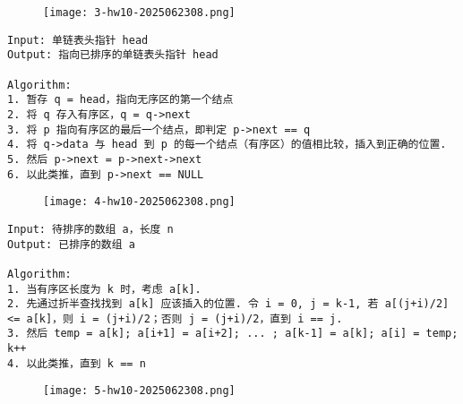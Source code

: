 \begin{exercise}
\begin{figure}[H]
\centering
\texttt{[image: 3-hw10-2025062308.png]}
\label{}
\end{figure}
\end{exercise}
\begin{lstlisting}
Input: 单链表头指针 head
Output: 指向已排序的单链表头指针 head

Algorithm:
1. 暂存 q = head，指向无序区的第一个结点
2. 将 q 存入有序区，q = q->next
3. 将 p 指向有序区的最后一个结点，即判定 p->next == q
4. 将 q->data 与 head 到 p 的每一个结点（有序区）的值相比较，插入到正确的位置.
5. 然后 p->next = p->next->next
6. 以此类推，直到 p->next == NULL
\end{lstlisting}
\begin{exercise}
\begin{figure}[H]
\centering
\texttt{[image: 4-hw10-2025062308.png]}
\label{}
\end{figure}
\end{exercise}
\begin{lstlisting}
Input: 待排序的数组 a，长度 n
Output: 已排序的数组 a

Algorithm:
1. 当有序区长度为 k 时，考虑 a[k].
2. 先通过折半查找找到 a[k] 应该插入的位置. 令 i = 0, j = k-1, 若 a[(j+i)/2] <= a[k]，则 i = (j+i)/2；否则 j = (j+i)/2，直到 i == j.
3. 然后 temp = a[k]; a[i+1] = a[i+2]; ... ; a[k-1] = a[k]; a[i] = temp; k++
4. 以此类推，直到 k == n

\end{lstlisting}
\begin{exercise}
\begin{figure}[H]
\centering
\texttt{[image: 5-hw10-2025062308.png]}
\label{}
\end{figure}
\end{exercise}
